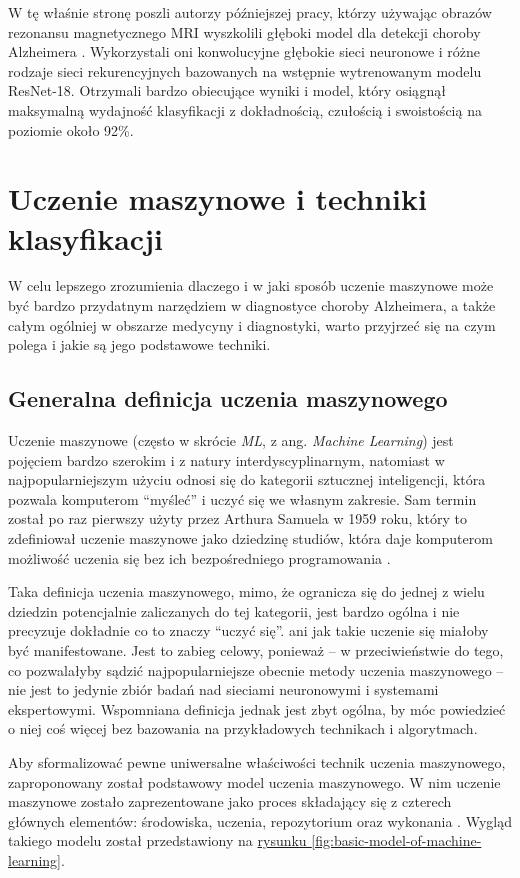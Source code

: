 W tę właśnie stronę poszli autorzy późniejszej pracy, którzy używając obrazów rezonansu magnetycznego MRI wyszkolili głęboki model dla detekcji choroby Alzheimera \cite{ebrahimi2021deep}.
Wykorzystali oni konwolucyjne głębokie sieci neuronowe i różne rodzaje sieci rekurencyjnych bazowanych na wstępnie wytrenowanym modelu ResNet-18.
Otrzymali bardzo obiecujące wyniki i model, który osiągnął maksymalną wydajność klasyfikacji z dokładnością, czułością i swoistością na poziomie około 92\%.

\section{Uczenie maszynowe i techniki klasyfikacji}

W celu lepszego zrozumienia dlaczego i w jaki sposób uczenie maszynowe może być bardzo przydatnym narzędziem w diagnostyce choroby Alzheimera, a także całym ogólniej w obszarze medycyny i diagnostyki, warto przyjrzeć się na czym polega i jakie są jego podstawowe techniki.

\subsection{Generalna definicja uczenia maszynowego}

Uczenie maszynowe (często w skrócie \emph{ML}, z ang. \emph{Machine Learning}) jest pojęciem bardzo szerokim i z natury interdyscyplinarnym, natomiast w najpopularniejszym użyciu odnosi się do kategorii sztucznej inteligencji, która pozwala komputerom ``myśleć'' i uczyć się we własnym zakresie.
Sam termin został po raz pierwszy użyty przez Arthura Samuela w 1959 roku, który to zdefiniował uczenie maszynowe jako dziedzinę studiów, która daje komputerom możliwość uczenia się bez ich bezpośredniego programowania \cite{samuel1959some}.

Taka definicja uczenia maszynowego, mimo, że ogranicza się do jednej z wielu dziedzin potencjalnie zaliczanych do tej kategorii, jest bardzo ogólna i nie precyzuje dokładnie co to znaczy ``uczyć się''. ani jak takie uczenie się miałoby być manifestowane.
Jest to zabieg celowy, ponieważ -- w przeciwieństwie do tego, co pozwalałyby sądzić najpopularniejsze obecnie metody uczenia maszynowego -- nie jest to jedynie zbiór badań nad sieciami neuronowymi i systemami ekspertowymi.
Wspomniana definicja jednak jest zbyt ogólna, by móc powiedzieć o niej coś więcej bez bazowania na przykładowych technikach i algorytmach.

Aby sformalizować pewne uniwersalne właściwości technik uczenia maszynowego, zaproponowany został podstawowy model uczenia maszynowego.
W nim uczenie maszynowe zostało zaprezentowane jako proces składający się z czterech głównych elementów: środowiska, uczenia, repozytorium oraz wykonania \cite{wang2009brief}.
Wygląd takiego modelu został przedstawiony na \hyperref[fig:basic-model-of-machine-learning]{rysunku \ref*{fig:basic-model-of-machine-learning}}.

